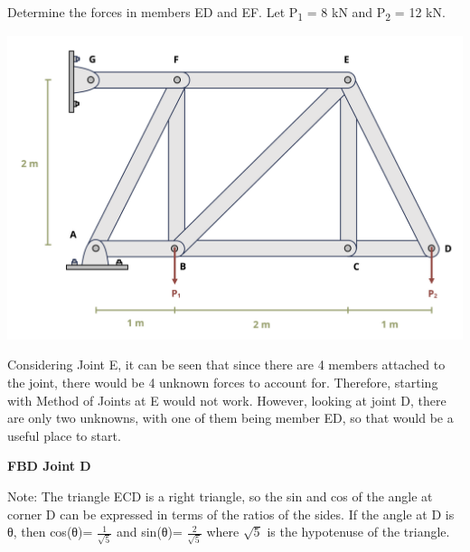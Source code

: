 \documentclass[
  letterpaper,
  DIV=11,
  numbers=noendperiod]{scrreprt}
\theoremstyle{definition}
\theoremstyle{remark}
\begin{document}
\begin{tcolorbox}[enhanced jigsaw, leftrule=.75mm, colbacktitle=quarto-callout-tip-color!10!white, breakable, opacityback=0, colback=white, titlerule=0mm, toprule=.15mm, colframe=quarto-callout-tip-color-frame, coltitle=black, title={Example 1.4}, toptitle=1mm, bottomrule=.15mm, rightrule=.15mm, left=2mm, arc=.35mm, opacitybacktitle=0.6, bottomtitle=1mm]

Determine the forces in members ED and EF. Let P\textsubscript{1} = 8 kN
and P\textsubscript{2} = 12 kN.

\begin{center}
\includegraphics{images/CH1 PNGs/example 1.4 part 1.png}
\end{center}

\begin{tcolorbox}[enhanced jigsaw, leftrule=.75mm, colbacktitle=quarto-callout-tip-color!10!white, breakable, opacityback=0, colback=white, titlerule=0mm, toprule=.15mm, colframe=quarto-callout-tip-color-frame, coltitle=black, title={Solution - Method of Joints}, toptitle=1mm, bottomrule=.15mm, rightrule=.15mm, left=2mm, arc=.35mm, opacitybacktitle=0.6, bottomtitle=1mm]

Considering Joint E, it can be seen that since there are 4 members
attached to the joint, there would be 4 unknown forces to account for.
Therefore, starting with Method of Joints at E would not work. However,
looking at joint D, there are only two unknowns, with one of them being
member ED, so that would be a useful place to start.

\textbf{FBD Joint D}

Note: The triangle ECD is a right triangle, so the sin and cos of the
angle at corner D can be expressed in terms of the ratios of the sides.
If the angle at D is θ, then cos(θ)= \(\frac{1}{\sqrt{5}}\) and sin(θ)=
\(\frac{2}{\sqrt{5}}\) where \(\sqrt{5}\) is the hypotenuse of the
triangle.


\end{tcolorbox}
\end{tcolorbox}
\end{document}
